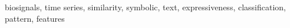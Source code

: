 %
%
%

\begin{keywords}
biosignals, time series, similarity, symbolic, text, expressiveness, classification, pattern, features
\end{keywords} 
